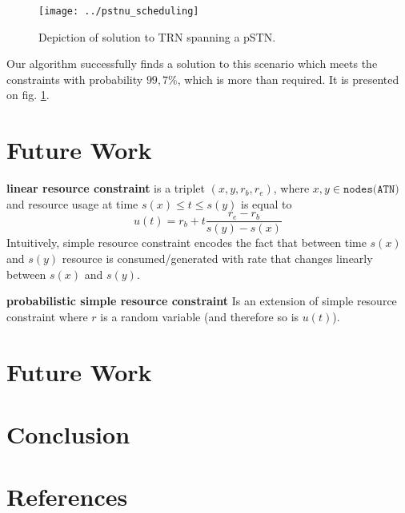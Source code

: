 \documentclass{article}
\begin{document}
\begin{multicols}{2}
\begin{figure}[H]
\begin{center}
\texttt{[image: ../pstnu\_scheduling]}
\caption{Depiction of solution to TRN spanning a pSTN.}
\label{fig:pstnu_scheduling}
\end{center}
\end{figure}

Our algorithm successfully finds a solution to this scenario which meets the constraints with probability $99,7\%$, which is more than required. It is presented on fig. \ref{fig:pstnu_scheduling}.



\section{Future Work}
\textbf{linear resource constraint} is a triplet $(x, y, r_b, r_e)$, where $x, y \in \texttt{nodes(ATN)}$ and resource usage at time $s(x) \leq t \leq s(y)$ is equal to
\[
    u(t) = r_b + t  \frac{r_e - r_b}{s(y) - s(x)}
\]
Intuitively, simple resource constraint encodes the fact that between time $s(x)$ and $s(y)$  resource is consumed/generated with rate that changes linearly between $s(x)$ and $s(y)$.

\textbf{probabilistic simple resource constraint}
Is an extension of simple resource constraint where $r$ is a random variable (and therefore so is $u(t)$).\section{Future Work}




\section{Conclusion}
\section{References}


\end{multicols}
\end{document}
